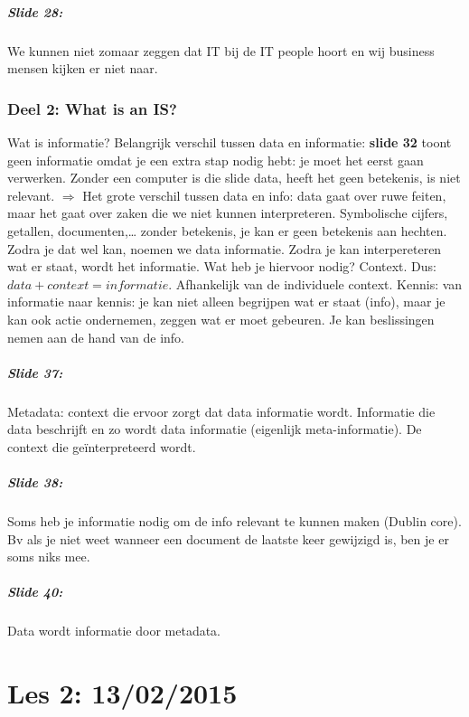 \documentclass[10pt,a4paper]{report}
\begin{document}
\paragraph{Slide 28:}We kunnen niet zomaar zeggen dat IT bij de IT people hoort en wij business mensen kijken er niet naar.

\subsection{Deel 2: What is an IS?}
Wat is informatie? Belangrijk verschil tussen data en informatie: \textbf{slide 32} toont geen informatie omdat je een extra stap nodig hebt: je moet het eerst gaan verwerken. Zonder een computer is die slide data, heeft het geen betekenis, is niet relevant. $\Rightarrow$ Het grote verschil tussen data en info: data gaat over ruwe feiten, maar het gaat over zaken die we niet kunnen interpreteren. Symbolische cijfers, getallen, documenten,… zonder betekenis, je kan er geen betekenis aan hechten. Zodra je dat wel kan, noemen we data informatie. Zodra je kan interpereteren wat er staat, wordt het informatie. Wat heb je hiervoor nodig? Context. Dus: $data + context = informatie$. Afhankelijk van de individuele context. Kennis: van informatie naar kennis: je kan niet alleen begrijpen wat er staat (info), maar je kan ook actie ondernemen, zeggen wat er moet gebeuren. Je kan beslissingen nemen aan de hand van de info. 

\paragraph{Slide 37:}Metadata: context die ervoor zorgt dat data informatie wordt. Informatie die data beschrijft en zo wordt data informatie (eigenlijk meta-informatie). De context die geïnterpreteerd wordt. 

\paragraph{Slide 38:}Soms heb je informatie nodig om de info relevant te kunnen maken (Dublin core). Bv als je niet weet wanneer een document de laatste keer gewijzigd is,  ben je er soms niks mee. 

\paragraph{Slide 40:}Data wordt informatie door metadata.

\chapter{Les 2: 13/02/2015}
\end{document}
